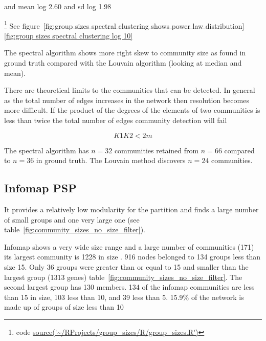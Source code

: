 






and mean log 2.60 and sd log 1.98

\footnote{code \url{source('~/RProjects/group_sizes/R/group_sizes.R')}}
See figure~\ref{fig:group sizes spectral clustering shows power law distribution} \ref{fig:group sizes spectral clustering log 10}




 

The spectral algorithm shows more right skew to community size as found in ground truth compared with the Louvain algorithm (looking at median and mean).

There are theoretical limits to the communities that can be detected. In general as the total number of edges increases in the network then resolution becomes more difficult. If the product of the degrees of the elements of two communities is less than twice the total number of edges community detection will fail

\begin{equation}
    K1K2 < 2m
\end{equation}



 The spectral algorithm has $n=32$ communities retained from $n=66$ compared to $n=36$ in ground truth. The Louvain method discovers $n=24$ communities.
 
 \subsection{Infomap PSP}
  It provides a relatively low modularity for the partition and finds a large number of small groups and one very large one (see table~\ref{fig:community_sizes_no_size_filter}). 

Infomap shows a very wide size range and a large number of communities (171) its largest community is 1228 in size . 916 nodes belonged to 134 groups less than size 15. Only 36 groups were greater than or equal to 15 and smaller than the largest group (1313 genes) table~\ref{fig:community_sizes_no_size_filter}. The second largest group has 130 members.  134 of the infomap communities are less than 15 in size, 103 less than 10, and 39 less than 5. 15.9\% of the network is made up of groups of size less than 10

